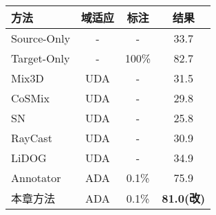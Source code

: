 \begin{table}[H]
	\renewcommand{\arraystretch}{1}
    \centering
    \setlength{\tabcolsep}{12mm}
    \label{tab:3-3}
    \wuhao
    \begin{tabular}{lccc}
        \toprule[1.5pt]
        \textbf{方法} & \textbf{域适应} & \textbf{标注} & \textbf{结果} \\
        \midrule
        Source-Only   & -       & -           & 33.7 \\
        Target-Only   & -       & 100\%           & 82.7 \\
        Mix3D         & UDA     & -   & 31.5 \\
        CoSMix        & UDA     & -   & 29.8 \\
        SN              & UDA   & -     & 25.8 \\
        RayCast        & UDA    & -    & 30.9 \\
        LiDOG        & UDA      & -       & 34.9 \\
        Annotator     & ADA     & 0.1\%     & 75.9 \\
        本章方法       & ADA    & 0.1\%      & \textbf{81.0(改)} \\
        \bottomrule[1.5pt]
    \end{tabular}
\end{table}